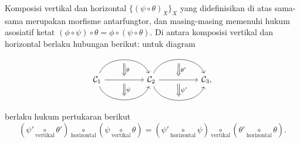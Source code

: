 \begin{lemma}\label{prop:naturaltrans-associativity}
	Komposisi vertikal dan horizontal $\{ (\psi \circ \theta)_X \}_X$ yang didefinisikan di atas sama-sama merupakan morfisme antarfungtor, dan masing-masing memenuhi hukum asosiatif ketat $(\phi \circ \psi) \circ \theta = \phi \circ (\psi \circ \theta)$. Di antara komposisi vertikal dan horizontal berlaku hubungan berikut: untuk diagram
	\[\begin{tikzcd}
		\mathcal{C}_1
		\arrow[bend left=70, rr, ""' name=U]
		\arrow[rr, "" name=MM, ""' name=M]
		\arrow[bend right=70, rr, "" name=D] & &
		\arrow[Rightarrow, to path=(U) -- (MM) \tikztonodes, "\theta"] \arrow[Rightarrow, to path=  (M) -- (D) \tikztonodes, "\psi"] \mathcal{C}_2
		\arrow[bend left=70, rr, ""' name=V]
		\arrow[rr, "" name=NN, ""' name=N]
		\arrow[bend right=70, rr, "" name=E] & &
		\arrow[Rightarrow, to path=(V) -- (NN) \tikztonodes, "\theta'"] \arrow[Rightarrow, to path=  (N) -- (E) \tikztonodes, "\psi'"] \mathcal{C}_3 ,
	\end{tikzcd} \]
	berlaku hukum pertukaran berikut
	\[ \left( \psi' \underset{\text{vertikal}}{\circ} \theta'\right) \underset{\text{horizontal}}{\circ} \left( \psi \underset{\text{vertikal}}{\circ} \theta\right) = \left( \psi' \underset{\text{horizontal}}{\circ} \psi \right) \underset{\text{vertikal}}{\circ} \left( \theta' \underset{\text{horizontal}}{\circ} \theta\right).  \]
\end{lemma}
